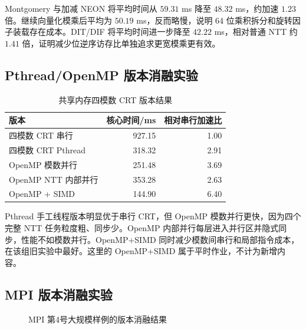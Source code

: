 Montgomery 与加减 NEON 将平均时间从 $59.31$ ms 降至 $48.32$ ms，约加速 $1.23$ 倍。继续向量化模乘后平均为 $50.19$ ms，反而略慢，说明 64 位乘积拆分和旋转因子装载存在成本。DIT/DIF 将平均时间进一步降至 $42.22$ ms，相对普通 NTT 约 $1.41$ 倍，证明减少位逆序访存比单独追求更宽模乘更有效。

\subsection{Pthread/OpenMP 版本消融实验}

\begin{table}[H]
  \centering
  \caption{共享内存四模数 CRT 版本结果}
  \label{tab:thread-result}
  \begin{tabular}{l r r}
    \toprule
    版本 & 核心时间/ms & 相对串行加速比 \\
    \midrule
    四模数 CRT 串行 & 927.15 & 1.00 \\
    四模数 CRT Pthread & 318.32 & 2.91 \\
    OpenMP 模数并行 & 251.48 & 3.69 \\
    OpenMP NTT 内部并行 & 353.28 & 2.63 \\
    OpenMP + SIMD & 144.90 & 6.40 \\
    \bottomrule
  \end{tabular}
\end{table}

Pthread 手工线程版本明显优于串行 CRT，但 OpenMP 模数并行更快，因为四个完整 NTT 任务粒度粗、同步少。OpenMP 内部并行每层进入并行区并隐式同步，性能不如模数并行。OpenMP+SIMD 同时减少模数间串行和局部指令成本，在该组旧实验中最好。这里的 OpenMP+SIMD 属于平时作业，不计为新增内容。

\subsection{MPI 版本消融实验}

\begin{figure}[H]
  \centering
  \caption{MPI 第4号大规模样例的版本消融结果}
  \label{fig:mpi-speedup}
\end{figure}

